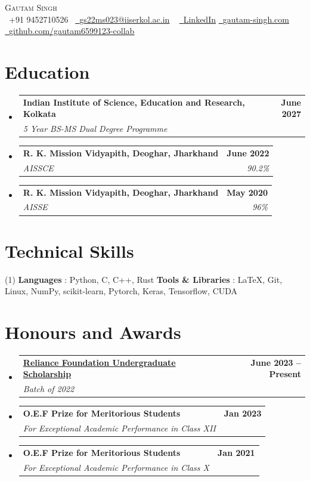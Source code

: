 \documentclass[letterpaper,11pt]{article}
\makeatletter
\newcommand{\resumeSubheading}[4]{
  \vspace{-2pt}\item
    \begin{tabular*}{1.0\textwidth}[t]{l@{\extracolsep{\fill}}r}
      \textbf{#1} & \textbf{\small #2} \\
      \textit{\small#3} & \textit{\small #4} \\
    \end{tabular*}\vspace{-7pt}
}
\newcommand{\resumeSubHeadingListStart}{\begin{itemize}[leftmargin=0.0in, label={}]}
\newcommand{\resumeSubHeadingListEnd}{\end{itemize}}
\makeatother
\begin{document}
\begin{center}
  {\Huge \scshape Gautam Singh} \\ \vspace{5pt}
  \small \raisebox{-0.1\height}\faPhone\ +91 9452710526~ \href{mailto:gs22ms023@iiserkol.ac.in}{\raisebox{-0.2\height}\faEnvelope\  \underline{gs22ms023@iiserkol.ac.in}} ~
  \href{https://www.linkedin.com/in/gautam-singh-81466a218/}{\raisebox{-0.2\height}\faLinkedin\ \underline{LinkedIn}}
  \href{https://gautam-singh.com/}{\raisebox{-0.2\height}\faCode\ \underline{gautam-singh.com}}
  \href{https://github.com/gautam6599123-collab}{\raisebox{-0.2\height}\faGithub\ \underline{github.com/gautam6599123-collab}}
\end{center}
\vspace{-10pt}
\section{Education}
\resumeSubHeadingListStart
  \resumeSubheading
      {Indian Institute of Science, Education and Research, Kolkata}{June 2027}
      {5 Year BS-MS Dual Degree Programme}{}
      \vspace{-5pt}
    \resumeSubheading
      {R. K. Mission Vidyapith, Deoghar, Jharkhand}{June 2022}
      {AISSCE}{90.2\%}
\vspace{-5pt}
      \resumeSubheading
        {R. K. Mission Vidyapith, Deoghar, Jharkhand}{May 2020}
        {AISSE}{96\%}
\resumeSubHeadingListEnd

\vspace{-15pt}

\section{Technical Skills} 
\vspace{-10pt}
\begin{tasks} [style=itemize, after-item-skip=0.5ex](1)
\task \textbf{Languages} : Python, C, C++, Rust
\task \textbf{Tools \& Libraries} : \LaTeX, Git, Linux, NumPy, scikit-learn, Pytorch, Keras, Tensorflow, CUDA
\end{tasks}

\vspace{-15pt}

\section{Honours and Awards}
\resumeSubHeadingListStart
\resumeSubheading{\underline{Reliance Foundation Undergraduate Scholarship}}{June 2023 -- Present}{Batch of 2022}{}
\resumeSubheading{O.E.F Prize for Meritorious Students}{Jan 2023}{For Exceptional Academic Performance in Class XII}{}
\resumeSubheading{O.E.F Prize for Meritorious Students}{Jan 2021}{For Exceptional Academic Performance in Class X}{}
\resumeSubHeadingListEnd
\end{document}

